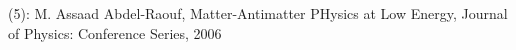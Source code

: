 \documentclass[preview]{standalone}
\begin{document}
\begin{center}
(5): M. Assaad Abdel-Raouf, Matter-Antimatter PHysics at Low Energy, Journal of Physics: Conference Series, 2006
\end{center}
\end{document}
